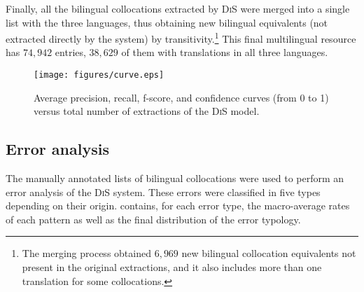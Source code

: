 \documentclass[output=paper,modfonts,nonflat]{langsci/langscibook}
\begin{document}
Finally, all the bilingual collocations extracted by \textsc{DiS} were merged
into a single list with the three languages, thus obtaining new bilingual
equivalents (not extracted directly by the system) by transitivity.\footnote{The merging process
  obtained $6,969$ new bilingual collocation equivalents not present in the original extractions, and it also
  includes more than one translation for some collocations.}
This final multilingual resource has $74,942$ entries, $38,629$ of them with translations in all three languages.

\begin{figure}
  \centering
  \texttt{[image: figures/curve.eps]}
  \caption{\label{fig:curva}Average precision, recall, f-score, and confidence
    curves (from 0 to 1) versus total number of extractions of the \textsc{DiS} model.}
\end{figure}

%
\subsection{Error analysis}
\label{garcia:sec:error}
The manually annotated lists of bilingual collocations were used to perform an error analysis
of the \textsc{DiS} system. These errors were classified in five types depending on
their origin.  contains, for each error type, the macro-average rates
of each  pattern as well as the final distribution of the error typology.
\end{document}
